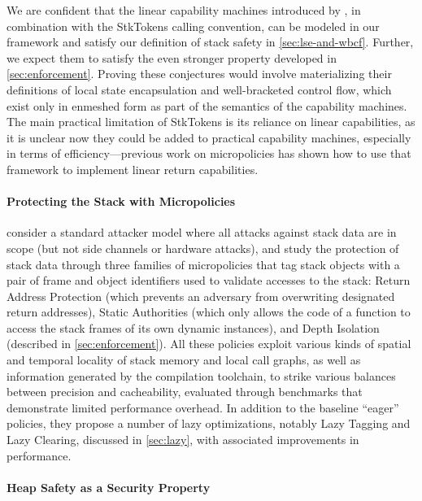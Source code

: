 \documentclass[acmsmall,review,anonymous]{acmart}\settopmatter{printfolios=true,printccs=false,printacmref=false}
\begin{document}
{{We are confident that the linear capability machines introduced by
\citep{Skorstengaard+19}, in combination with the StkTokens calling convention,
can be modeled in our framework and satisfy our definition of stack safety in
\cref{sec:lse-and-wbcf}. Further, we expect them to satisfy the even stronger
property developed in \cref{sec:enforcement}. Proving these conjectures would
involve materializing their definitions of local state encapsulation and
well-bracketed control flow, which exist only in enmeshed form as part of the
semantics of the capability machines. The main practical limitation of StkTokens
is its reliance on linear capabilities, as it is unclear now they could be added
to practical capability machines, especially in terms of efficiency---previous
work on micropolicies \citep{yannis-report} has shown how to use that framework
to implement linear return capabilities.

\paragraph{Protecting the Stack with Micropolicies}
%
\citet{DBLP:conf/sp/RoesslerD18} consider a standard attacker model where all
attacks against stack data are in scope (but not side channels or hardware
attacks), and study the protection of stack data through three families of
micropolicies that tag stack objects with a pair of frame and object identifiers
used to validate accesses to the stack: Return Address Protection (which
prevents an adversary from overwriting designated return addresses), Static
Authorities (which only allows the code of a function to access the stack frames
of its own dynamic instances), and Depth Isolation (described in
\cref{sec:enforcement}). All these policies exploit various kinds of spatial and
temporal locality of stack memory and local call graphs, as well as information
generated by the compilation toolchain, to strike various balances between
precision and cacheability, evaluated through benchmarks that demonstrate
limited performance overhead. In addition to the baseline ``eager'' policies,
they propose a number of lazy optimizations, notably Lazy Tagging and Lazy
Clearing, discussed in \cref{sec:lazy}, with associated improvements in
performance.

\paragraph{Heap Safety as a Security Property}

}}
\end{document}

